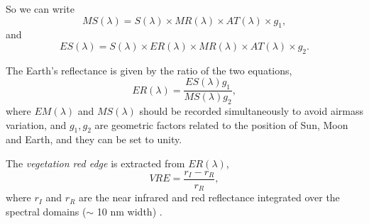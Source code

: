 So we can write
$$ MS(\lambda) = S(\lambda) \times MR(\lambda) \times AT(\lambda) \times g_1,$$
and
$$ ES(\lambda) = S(\lambda) \times ER(\lambda) \times MR(\lambda) \times
AT(\lambda) \times g_2.$$

The Earth's reflectance is given by the ratio of the two equations,
\begin{equation}
 ER(\lambda) = \frac{ES(\lambda) g_1}{MS(\lambda) g_2},
\label{skyy}
\end{equation}
where $EM(\lambda)$ and $MS(\lambda)$ should be recorded simultaneously to avoid
airmass variation, and $g_1, g_2$ are geometric factors related to the position
of Sun, Moon and Earth, and they can be set to unity. 


The {\it vegetation red edge} is extracted from $ER(\lambda)$,
\begin{equation}
 VRE = \frac{r_I-r_R}{r_R},
\label{vge}
\end{equation}
where $r_I$ and $r_R$ are the near  infrared and red reflectance integrated over
the spectral domains ($\sim$ 10 nm width) \cite{arnold_etal07}
\cite{arnold_etal02} \cite{writeup}.


